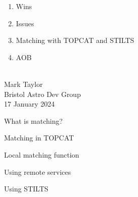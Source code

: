\documentclass[20pt,landscape]{foils}
\begin{document}
\sf

\newcommand{\bigword}[1]{
  \vspace*{7cm}
  \begin{center}
    \color{darkblue}
    \scalebox{3}{
      \Huge\bf #1
    }
  \end{center}
  \addtocounter{page}{-1}
}

\rightfooter{}
\MyLogo{}

\vspace*{3cm}
\hspace*{5cm}
\begin{minipage}{30cm}
\LARGE
\begin{enumerate}
  \item Wins
  \item Issues
  \item Matching with TOPCAT and STILTS
  \item AOB
\end{enumerate}
\end{minipage}

\newpage
\bigword{Wins?}
\newpage
\bigword{Issues?}
\newpage

\rightfooter{\quad{\color{grey}\thepage/\pageref*{lastPage}}}
\setcounter{page}{1}

\vspace*{1.0cm}
\begin{center}
{\color{darkblue}
}
\\[2.0cm]
{\Large 
  Mark Taylor
}
\\[2.0cm]
{\large\color{grey}
  Bristol Astro Dev Group
  \\[2ex]
  17 January 2024
}
\end{center}

\vspace*{1.5cm}
\begin{center}
  \tiny
  \color{brown}
  
\end{center}


\begin{list1}
  \item What is matching?
  \item Matching in TOPCAT
  \begin{list2big}
    \item Local matching function
    \item Using remote services
  \end{list2big}
  \item Using STILTS
\end{list1}
\end{document}
